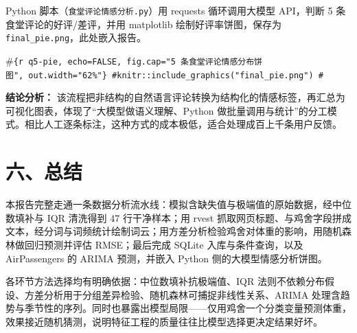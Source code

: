 \documentclass[
]{ctexart}
\begin{document}
Python 脚本（\texttt{食堂评论情感分析.py}）用 requests 循环调用大模型
API，判断 5 条食堂评论的好评/差评，并用 matplotlib
绘制好评率饼图，保存为 \texttt{final\_pie.png}，此处嵌入报告。

\#\texttt{\{r\ q5-pie,\ echo=FALSE,\ fig.cap="5\ 条食堂评论情感分布饼图",\ out.width="62\%"\}\ \#knitr::include\_graphics("final\_pie.png")\ \#}

\textbf{结论分析：}
该流程把非结构的自然语言评论转换为结构化的情感标签，再汇总为可视化图表，体现了``大模型做语义理解、Python
做批量调用与统计''的分工模式。相比人工逐条标注，这种方式的成本极低，适合处理成百上千条用户反馈。

\section{六、总结}\label{ux516dux603bux7ed3}

本报告完整走通一条数据分析流水线：模拟含缺失值与极端值的原始数据，经中位数填补与
IQR 清洗得到 47 行干净样本；用 rvest
抓取网页标题、与鸡舍字段拼成文本，经分词与词频统计绘制词云；用方差分析检验鸡舍对体重的影响，用随机森林做回归预测并评估
RMSE；最后完成 SQLite 入库与条件查询，以及 AirPassengers 的 ARIMA
预测，并嵌入 Python 侧的大模型情感分析饼图。

各环节方法选择均有明确依据：中位数填补抗极端值、IQR
法则不依赖分布假设、方差分析用于分组差异检验、随机森林可捕捉非线性关系、ARIMA
处理含趋势与季节性的序列。同时也暴露出模型局限------仅用鸡舍一个分类变量预测体重，效果接近随机猜测，说明特征工程的质量往往比模型选择更决定结果好坏。
\end{document}

